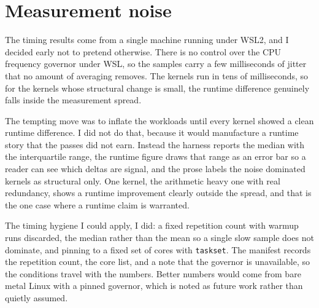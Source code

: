 \section{Measurement noise}

The timing results come from a single machine running under WSL2, and I decided
early not to pretend otherwise. There is no control over the CPU frequency
governor under WSL, so the samples carry a few milliseconds of jitter that no
amount of averaging removes. The kernels run in tens of milliseconds, so for the
kernels whose structural change is small, the runtime difference genuinely falls
inside the measurement spread.

The tempting move was to inflate the workloads until every kernel showed a clean
runtime difference. I did not do that, because it would manufacture a runtime
story that the passes did not earn. Instead the harness reports the median with
the interquartile range, the runtime figure draws that range as an error bar so a
reader can see which deltas are signal, and the prose labels the noise dominated
kernels as structural only. One kernel, the arithmetic heavy one with real
redundancy, shows a runtime improvement clearly outside the spread, and that is
the one case where a runtime claim is warranted.

The timing hygiene I could apply, I did: a fixed repetition count with warmup
runs discarded, the median rather than the mean so a single slow sample does not
dominate, and pinning to a fixed set of cores with \texttt{taskset}. The manifest
records the repetition count, the core list, and a note that the governor is
unavailable, so the conditions travel with the numbers. Better numbers would come
from bare metal Linux with a pinned governor, which is noted as future work
rather than quietly assumed.
